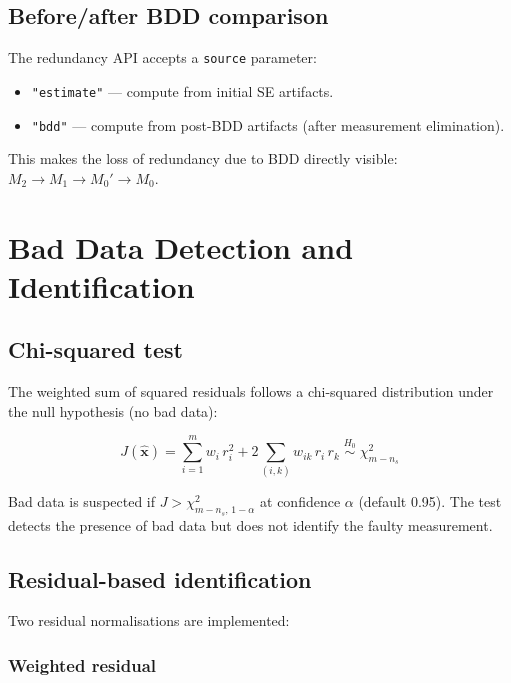 \documentclass[11pt,a4paper]{article}
\begin{document}
\subsection{Before/after BDD comparison}

The redundancy API accepts a \texttt{source} parameter:
\begin{itemize}
  \item \texttt{"estimate"} --- compute from initial SE artifacts.
  \item \texttt{"bdd"} --- compute from post-BDD artifacts (after
        measurement elimination).
\end{itemize}
This makes the loss of redundancy due to BDD directly visible:
$M_2 \to M_1 \to M_0' \to M_0$.



\section{Bad Data Detection and Identification}\label{sec:bdd}

\subsection{Chi-squared test}

The weighted sum of squared residuals follows a chi-squared distribution
under the null hypothesis (no bad data):

\begin{equation}
  J(\hat{\mathbf{x}}) = \sum_{i=1}^{m} w_i\,r_i^2
    + 2\sum_{(i,k)} w_{ik}\,r_i\,r_k
  \;\overset{H_0}{\sim}\;
  \chi^2_{m - n_s}
\end{equation}

Bad data is suspected if $J > \chi^2_{m-n_s,\,1-\alpha}$ at confidence
$\alpha$ (default 0.95).  The test detects the presence of bad data but
does not identify the faulty measurement.

\subsection{Residual-based identification}

Two residual normalisations are implemented:

\subsubsection{Weighted residual}
\end{document}
